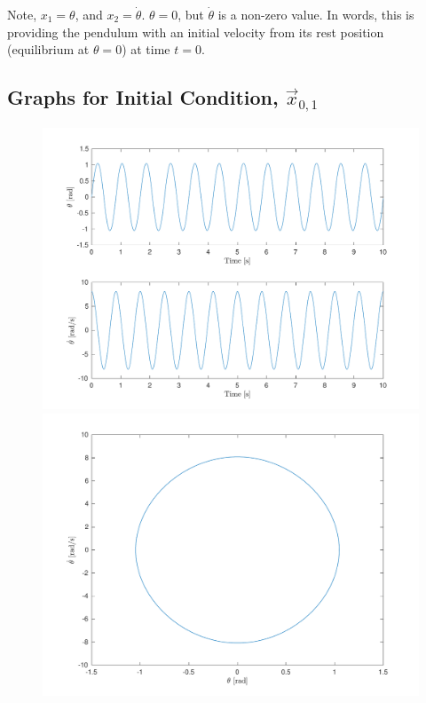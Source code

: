 \documentclass[10pt]{article}
\begin{document}
Note, $x_1 = \theta$, and $x_2 = \dot{\theta}$. 
$\theta = 0$, but $\dot{\theta}$ is a non-zero value. In words, this is providing the pendulum with an initial velocity from its rest position (equilibrium at $\theta = 0$) at time $t = 0$.

\subsection{Graphs for Initial Condition, \texorpdfstring{$\vec{x}_{0,1}$}{x01}}
\begin{figure}[ht]
    \centering
    \begin{minipage}[b]{0.45\textwidth}
        \centering
        \includegraphics[width=1\linewidth]{lab1/figs/section3_x0_1_state_evolution.pdf}
    \end{minipage}
    \begin{minipage}[b]{0.45\textwidth}
        \centering
        \includegraphics[width=1\linewidth]{lab1/figs/section3_x0_1_state_orbit.pdf}
    \end{minipage}
    
    \label{figure:x_0_1_state_evolution}
\end{figure}
    
\end{document}
